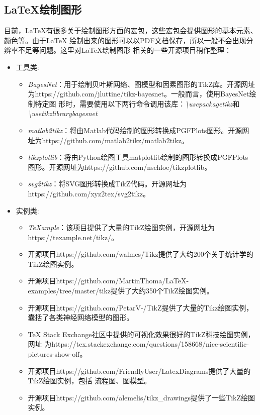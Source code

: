 \subsection{\LaTeX 绘制图形}
目前，LaTeX有很多关于绘制图形方面的宏包，这些宏包会提供图形的基本元素、颜色等。由于LaTeX
绘制出来的图形可以以PDF文档保存，所以一般不会出现分辨率不足等问题。这里对LaTeX绘制图形
相关的一些开源项目稍作整理：

\begin{itemize}
      \item 工具类:
            \begin{itemize}
                  \item \emph{BayesNet}：用于绘制贝叶斯网络、图模型和因素图形的TikZ库。开源网址
                        为https://github.com/jluttine/tikz-bayesnet。一般而言，使用BayesNet绘制特定图
                        形时，需要使用以下两行命令调用该库：\emph{\textbackslash usepackage{tikz}}和
                        \emph{\textbackslash usetikzlibrary{bayesnet}}
                  \item \emph{matlab2tikz}：将由Matlab代码绘制的图形转换成PGFPlots图形。开源网
                        址为https://github.com/matlab2tikz/matlab2tikz。
                  \item \emph{tikzplotlib}：将由Python绘图工具matplotlib绘制的图形转换成PGFPlots
                        图形。开源网址为https://github.com/nschloe/tikzplotlib。
                  \item \emph{svg2tikz}：将SVG图形转换成TikZ代码。开源网址为https://github.com/xyz2tex/svg2tikz。
            \end{itemize}
      \item 实例类:
            \begin{itemize}
                  \item \emph{TeXample}：该项目提供了大量的TikZ绘图实例，开源网址为https://texample.net/tikz/。
                  \item 开源项目https://github.com/walmes/Tikz提供了大约200个关于统计学的TikZ绘图实例。
                  \item 开源项目https://github.com/MartinThoma/LaTeX-examples/tree/master/tikz提供了大约350个TikZ绘图实例。
                  \item 开源项目https://github.com/PetarV-/TikZ提供了大量的Tikz绘图实例，囊括了各类神经网络模型的图形。
                  \item TeX Stack Exchange社区中提供的可视化效果很好的TikZ科技绘图实例，网址
                        为https://tex.stackexchange.com/questions/158668/nice-scientific-pictures-show-off。
                  \item 开源项目https://github.com/FriendlyUser/LatexDiagrams提供了大量的TikZ绘图实例，包括
                        流程图、图模型。
                  \item 开源项目https://github.com/alemelis/tikz\_drawings提供了一些TikZ绘图实例。
            \end{itemize}
\end{itemize}

